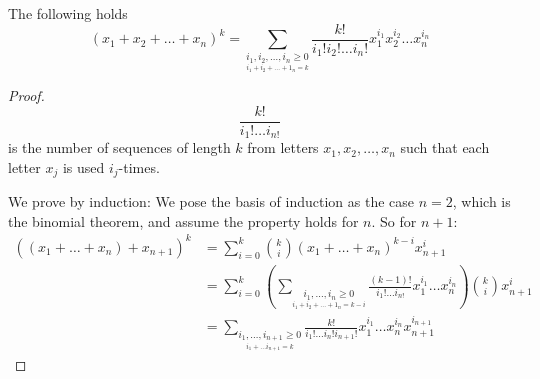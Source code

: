 \begin{theorem}
The following holds
$$
(x_{1}+x_{2}+\dots +x_{n})^{k}=\sum _{\underset{i_{1}+i_{2}+\dots +1_{n}=k}{i_{1},i_{2},\dots,i_{n}\ge 0}} \frac{k!}{i_{1}!i_{2}!\dots i_{n}!} x_{1}^{i_{1}}x_{2}^{i_{2}}\dots x_{n}^{i_{n}}
$$
\end{theorem}
\begin{proof}
$$
\frac{k!}{i_{1}!\dots i_{n!}}
$$
is the number of sequences of length $k$ from letters $x_{1},x_{2},\dots,x_{n}$ such that each letter $x_{j}$ is used $i_{j}$-times.

We prove by induction: We pose the basis of induction as the case $n=2$, which is the binomial theorem, and assume the property holds for $n$. So for $n+1$:
\begin{align*}
((x_{1}+\dots +x_{n})+x_{n+1})^{k} & =\sum_{i=0}^{k} \binom{ k}  {i } (x_{1}+\dots +x_{n})^{k-i}x_{n+1}^{i} \\
 & =\sum_{i=0}^{k} \left( \sum_{\underset{i_{1}+i_{2}+\dots +1_{n}=k-i}{i_{1},\dots ,i_{n}\ge 0}} \frac{(k-1)!}{i_{1}!\dots i_{n!}}x_{1}^{i_{1}}\dots x_{n}^{i_{n}} \right)\binom{ k}  {i } x_{n+1}^{i} \\
 & =\sum _{\underset{i_{1}+\dots i_{n+1}=k}{i_{1},\dots,i_{n+1}\ge 0}} \frac{k!}{i_{1}!\dots i_{n}!i_{n+1}!} x_{1}^{i_{1}}\dots x_{n}^{i_{n}}x_{n+1}^{i_{n+1}}
\end{align*}

\end{proof}

